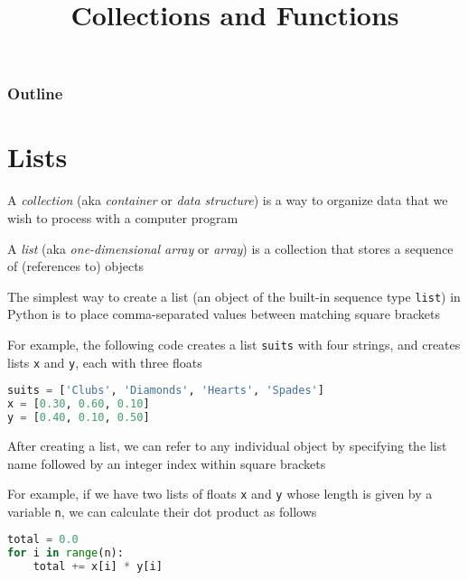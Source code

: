 \documentclass[8pt,a4paper,compress]{beamer}
\title{Collections and Functions}
\date{}
\begin{document}
\begin{frame}
\vfill
\titlepage
\end{frame}

\begin{frame}
\frametitle{Outline}
\tableofcontents
\end{frame}

\section{Lists}
\begin{frame}[fragile]
A \emph{collection} (aka \emph{container} or \emph{data structure}) is a way to organize data that we wish to process with a computer program

\bigskip

A \emph{list} (aka \emph{one-dimensional array} or \emph{array}) is a collection that stores a sequence of (references to) objects

\bigskip

The simplest way to create a list (an object of the built-in sequence type \lstinline{list}) in Python is to place comma-separated values between matching square brackets

\bigskip

For example, the following code creates a list \lstinline{suits} with four strings, and creates lists \lstinline{x} and \lstinline{y}, each with three floats

\begin{lstlisting}[language=Python]
suits = ['Clubs', 'Diamonds', 'Hearts', 'Spades']
x = [0.30, 0.60, 0.10]
y = [0.40, 0.10, 0.50]
\end{lstlisting}

\bigskip

After creating a list, we can refer to any individual object by specifying the list name followed by an integer index within square brackets

\bigskip

For example, if we have two lists of floats \lstinline{x} and \lstinline{y} whose length is given by a variable \lstinline{n}, we can calculate their dot product as follows

\begin{lstlisting}[language=Python]
total = 0.0
for i in range(n):
    total += x[i] * y[i]
\end{lstlisting} 
\end{frame}
\end{document}
